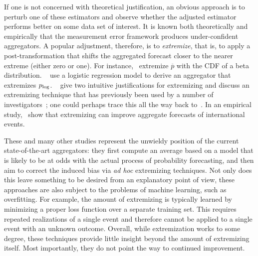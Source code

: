 \documentclass[12pt]{article}
\theoremstyle{definition}
\theoremstyle{definition}
\def\pb{\overline{p}}
\def\plog{p_{\rm log}}
\begin{document}
If one is not concerned with theoretical justification, an obvious
approach is to perturb one of these estimators and observe whether the
adjusted estimator performs better on some data set of interest.  It
is known both theoretically and empirically that the measurement error
framework produces under-confident aggregators.  A popular adjustment,
therefore, is to {\em extremize}, that is, to apply a
post-transformation that shifts the aggregated forecast closer to the
nearer extreme (either zero or one).  For instance,~\citet{Ranjan08} 
extremize $\pb$ with the CDF of a
beta distribution.  ~\citet{satopaa} use a logistic
regression model to derive an aggregator that extremizes $\plog$.  ~\citet{baron2014two} give two intuitive justifications for
extremizing and discuss an extremizing technique that has previously
been used by a number of investigators~\citep{Erev1994,
shlomi2010subjective}; one could perhaps trace this all the way back
to~\citet{karmarkar1978subjectively}.  In an empirical
study,~\citet{mellers2014psychological} show that extremizing can
improve aggregate forecasts of international events.

These and many other studies represent the unwieldy position of the
 current state-of-the-art aggregators: they first compute an average 
 based on a model that is
likely to be at odds with the actual process of probability
forecasting, and  then aim to correct the induced bias  via {\em ad hoc}
extremizing techniques.
%
Not only does this leave something to be desired from an explanatory
point of view, these approaches are also subject to the problems of
machine learning, such as overfitting.  For example, the amount of 
extremizing is typically learned by minimizing a
proper loss function over a separate training set. This requires repeated realizations
of a single event and therefore cannot be applied to a single event with an unknown outcome. Overall, while 
extremization works to some degree, these techniques provide little
insight beyond the amount of extremizing itself. Most importantly, they do not point
the way to continued improvement.
\end{document}
